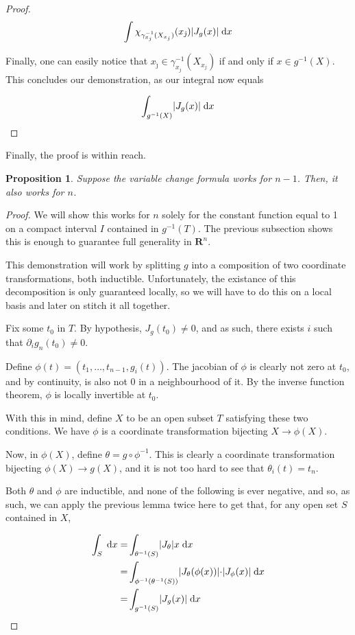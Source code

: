 \documentclass[11pt]{article}
\theoremstyle{definition}
\theoremstyle{plain}
\newtheorem{prop}{Proposition}
\newcommand{\R}{\mathbf{R}}
\newcommand{\mo}{^{-1}}
\begin{document}
\begin{proof}
\[ \int \chi_{\gamma_{x_j}\mo(X_{x_j})}(x_{\hat\jmath}) \lvert J_g(x) \rvert \d{x} \]

Finally, one can easily notice that $x_{\hat\jmath} \in \gamma_{x_j}\mo(X_{x_j})$ if and only if ${x \in g\mo(X)}$. This concludes our demonstration, as our integral now equals

\[ \int_{g\mo(X)} \lvert J_g(x) \rvert \d{x} \]
\end{proof}

Finally, the proof is within reach.

\begin{prop}
Suppose the variable change formula works for $n-1$. Then, it also works for $n$.
\end{prop}

\begin{proof}
We will show this works for $n$ solely for the constant function equal to 1 on a compact interval $I$ contained in $g\mo(T)$. The previous subsection shows this is enough to guarantee full generality in $\R^n$.

This demonstration will work by splitting $g$ into a composition of two coordinate transformations, both inductible. Unfortunately, the existance of this decomposition is only guaranteed locally, so we will have to do this on a local basis and later on stitch it all together.

Fix some $t_0$ in $T$. By hypothesis, $J_g(t_0) \neq 0$, and as such, there exists $i$ such that $\partial_i g_n(t_0) \neq 0$.

Define $\phi(t) = (t_1, \ldots, t_{n-1}, g_i(t))$. The jacobian of $\phi$ is clearly not zero at $t_0$, and by continuity, is also not 0 in a neighbourhood of it. By the inverse function theorem, $\phi$ is locally invertible at $t_0$.

With this in mind, define $X$ to be an open subset $T$ satisfying these two conditions. We have $\phi$ is a coordinate transformation bijecting $X \rightarrow \phi(X)$.

Now, in $\phi(X)$, define $\theta = g \circ \phi\mo$. This is clearly a coordinate transformation bijecting $\phi(X) \rightarrow g(X)$, and it is not too hard to see that $\theta_i(t) = t_n$. %

Both $\theta$ and $\phi$ are inductible, and none of the following is ever negative, and so, as such, we can apply the previous lemma twice here to get that, for any open set $S$ contained in $X$,

\begin{align*}
\int_S \d x =& \int_{\theta\mo(S)} \rvert J_{\theta} \lvert x \d x \\
=& \int_{\phi\mo(\theta\mo(S))} \rvert J_{\theta}(\phi(x)) \lvert \cdot \rvert J_\phi(x) \lvert \d x \\
=& \int_{g\mo(S)} \rvert J_g(x) \lvert \d x
\end{align*}


\end{proof}
\end{document}
